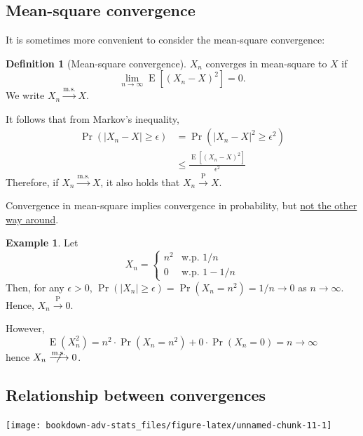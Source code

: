 \documentclass[
]{book}
\DeclareMathOperator{\E}{E}
\theoremstyle{definition}
\newtheorem{definition}{Definition}[chapter]
\theoremstyle{definition}
\newtheorem{example}{Example}[chapter]
\theoremstyle{definition}
\theoremstyle{definition}
\theoremstyle{remark}
\begin{document}
\hypertarget{mean-square-convergence}{%
\subsection{Mean-square convergence}\label{mean-square-convergence}}

It is sometimes more convenient to consider the mean-square convergence:

\begin{definition}[Mean-square convergence]
\(X_n\) converges in mean-square to \(X\) if
\[\lim_{n\to\infty} \E\left[(X_n - X)^2 \right] = 0.\]
We write \(X_n\xrightarrow{\text{m.s.}}X\).
\end{definition}

It follows that from Markov's inequality,
\[\begin{aligned}
\Pr(|X_n-X|\geq \epsilon)
&= \Pr(|X_n-X|^2\geq \epsilon^2) \\
    &\leq \frac{\E\left[(X_n - X)^2 \right]}{\epsilon^2}
\end{aligned}\]
Therefore, if \(X_n\xrightarrow{\text{m.s.}}X\), it also
holds that \(X_n\xrightarrow{\text{P}}X\).

Convergence in mean-square implies convergence in probability, but \uline{not the other way around}.

\begin{example}
Let
\[ X_n = 
    \begin{cases}
      n^2 &\text{w.p. } 1/n \\
      0 &\text{w.p. } 1- 1/n  
    \end{cases}\]
Then, for any \(\epsilon>0\),
\(\Pr(|X_n|\geq\epsilon) = \Pr(X_n = n^2) = 1/n \to 0\) as \(n\to\infty\).
Hence, \(X_n{\xrightarrow{\text{P}}}0\).

However, \[\E(X_n^2) = n^2 \cdot \Pr(X_n = n^2) + 0  \cdot \Pr(X_n = 0) = n \to \infty\] hence
\(X_n\centernot{\xrightarrow{\text{m.s.}}}0\).
\end{example}

\hypertarget{relationship-between-convergences}{%
\subsection{Relationship between convergences}\label{relationship-between-convergences}}

\begin{center}\texttt{[image: bookdown-adv-stats\_files/figure-latex/unnamed-chunk-11-1]} \end{center}
\end{document}
